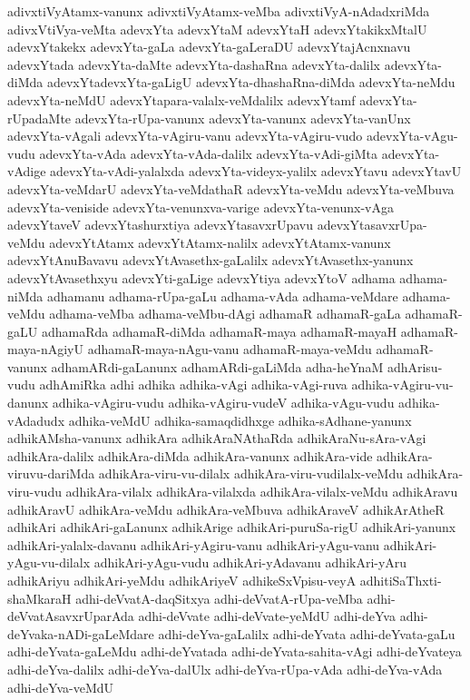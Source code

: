 {adivxtiVyAtamx-vanunx
adivxtiVyAtamx-veMba
adivxtiVyA-nAdadxriMda
adivxVtiVya-veMta
adevxYta
adevxYtaM
adevxYtaH
adevxYtakikxMtalU
adevxYtakekx
adevxYta-gaLa
adevxYta-gaLeraDU
adevxYtajAcnxnavu
adevxYtada
adevxYta-daMte
adevxYta-dashaRna
adevxYta-dalilx
adevxYta-diMda
adevxYtadevxYta-gaLigU
adevxYta-dhashaRna-diMda
adevxYta-neMdu
adevxYta-neMdU
adevxYtapara-valalx-veMdalilx
adevxYtamf
adevxYta-rUpadaMte
adevxYta-rUpa-vanunx
adevxYta-vanunx
adevxYta-vanUnx
adevxYta-vAgali
adevxYta-vAgiru-vanu
adevxYta-vAgiru-vudo
adevxYta-vAgu-vudu
adevxYta-vAda
adevxYta-vAda-dalilx
adevxYta-vAdi-giMta
adevxYta-vAdige
adevxYta-vAdi-yalalxda
adevxYta-videyx-yalilx
adevxYtavu
adevxYtavU
adevxYta-veMdarU
adevxYta-veMdathaR
adevxYta-veMdu
adevxYta-veMbuva
adevxYta-veniside
adevxYta-venunxva-varige
adevxYta-venunx-vAga
adevxYtaveV
adevxYtashurxtiya
adevxYtasavxrUpavu
adevxYtasavxrUpa-veMdu
adevxYtAtamx
adevxYtAtamx-nalilx
adevxYtAtamx-vanunx
adevxYtAnuBavavu
adevxYtAvasethx-gaLalilx
adevxYtAvasethx-yanunx
adevxYtAvasethxyu
adevxYti-gaLige
adevxYtiya
adevxYtoV
adhama
adhama-niMda
adhamanu
adhama-rUpa-gaLu
adhama-vAda
adhama-veMdare
adhama-veMdu
adhama-veMba
adhama-veMbu-dAgi
adhamaR
adhamaR-gaLa
adhamaR-gaLU
adhamaRda
adhamaR-diMda
adhamaR-maya
adhamaR-mayaH
adhamaR-maya-nAgiyU
adhamaR-maya-nAgu-vanu
adhamaR-maya-veMdu
adhamaR-vanunx
adhamARdi-gaLanunx
adhamARdi-gaLiMda
adha-heYnaM
adhArisu-vudu
adhAmiRka
adhi
adhika
adhika-vAgi
adhika-vAgi-ruva
adhika-vAgiru-vu-danunx
adhika-vAgiru-vudu
adhika-vAgiru-vudeV
adhika-vAgu-vudu
adhika-vAdadudx
adhika-veMdU
adhika-samaqdidhxge
adhika-sAdhane-yanunx
adhikAMsha-vanunx
adhikAra
adhikAraNAthaRda
adhikAraNu-sAra-vAgi
adhikAra-dalilx
adhikAra-diMda
adhikAra-vanunx
adhikAra-vide
adhikAra-viruvu-dariMda
adhikAra-viru-vu-dilalx
adhikAra-viru-vudilalx-veMdu
adhikAra-viru-vudu
adhikAra-vilalx
adhikAra-vilalxda
adhikAra-vilalx-veMdu
adhikAravu
adhikAravU
adhikAra-veMdu
adhikAra-veMbuva
adhikAraveV
adhikArAtheR
adhikAri
adhikAri-gaLanunx
adhikArige
adhikAri-puruSa-rigU
adhikAri-yanunx
adhikAri-yalalx-davanu
adhikAri-yAgiru-vanu
adhikAri-yAgu-vanu
adhikAri-yAgu-vu-dilalx
adhikAri-yAgu-vudu
adhikAri-yAdavanu
adhikAri-yAru
adhikAriyu
adhikAri-yeMdu
adhikAriyeV
adhikeSxVpisu-veyA
adhitiSaThxti-shaMkaraH
adhi-deVvatA-daqSitxya
adhi-deVvatA-rUpa-veMba
adhi-deVvatAsavxrUparAda
adhi-deVvate
adhi-deVvate-yeMdU
adhi-deYva
adhi-deYvaka-nADi-gaLeMdare
adhi-deYva-gaLalilx
adhi-deYvata
adhi-deYvata-gaLu
adhi-deYvata-gaLeMdu
adhi-deYvatada
adhi-deYvata-sahita-vAgi
adhi-deYvateya
adhi-deYva-dalilx
adhi-deYva-dalUlx
adhi-deYva-rUpa-vAda
adhi-deYva-vAda
adhi-deYva-veMdU
}
